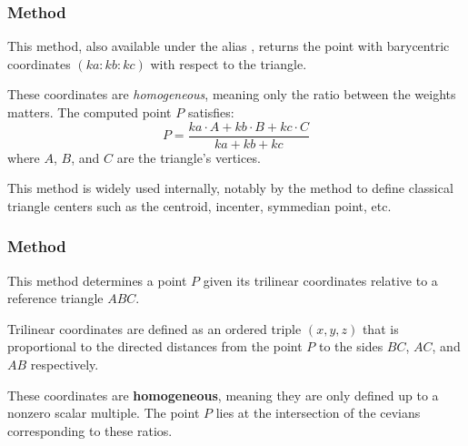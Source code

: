 \subsubsection{Method }
\label{ssub:_triangle_barycentric_ka_kb_kc}

This method, also available under the alias , returns the point with barycentric coordinates $(ka : kb : kc)$ with respect to the triangle.

\medskip

These coordinates are \emph{homogeneous}, meaning only the ratio between the weights matters. The computed point $P$ satisfies:
\[
P = \frac{ka \cdot A + kb \cdot B + kc \cdot C}{ka + kb + kc}
\]
where $A$, $B$, and $C$ are the triangle's vertices.

\medskip

This method is widely used internally, notably by the  method to define classical triangle centers such as the centroid, incenter, symmedian point, etc.


\vspace{1em}

\begin{tkzexample}[latex=.5\textwidth]
\end{tkzexample}

\subsubsection{Method }
\label{ssub:method_triangle_trilinear_x_y_z}

This method determines a point $P$ given its trilinear coordinates relative to a reference triangle $ABC$.

\medskip

Trilinear coordinates are defined as an ordered triple $(x, y, z)$ that is proportional to the directed distances from the point $P$ to the sides $BC$, $AC$, and $AB$ respectively.

\medskip

These coordinates are \textbf{homogeneous}, meaning they are only defined up to a nonzero scalar multiple. The point $P$ lies at the intersection of the cevians corresponding to these ratios.

